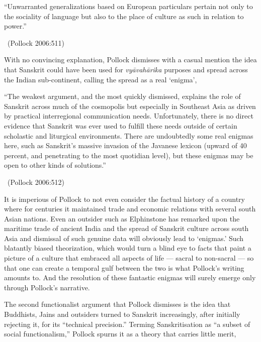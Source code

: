 \begin{myquote}
“Unwarranted generalizations based on European particulars pertain not only to the sociality of language but also to the place of culture as such in relation to power.” 

~\hfill (Pollock 2006:511)
\end{myquote}

With no convincing explanation, Pollock dismisses with a casual mention the idea that Sanskrit could have been used for \textit{vyāvahārika} purposes and spread across the Indian sub-continent, calling the spread as a real ‘enigma’,

\begin{myquote}
“The weakest argument, and the most quickly dismissed, explains the role of Sanskrit across much of the cosmopolis but especially in Southeast Asia as driven by practical interregional communication needs. Unfortunately, there is no direct evidence that Sanskrit was ever used to fulfill these needs outside of certain scholastic and liturgical environments. There are undoubtedly some real enigmas here, such as Sanskrit’s massive invasion of the Javanese lexicon (upward of 40 percent, and penetrating to the most quotidian level), but these enigmas may be open to other kinds of solutions.” 

~\hfill (Pollock 2006:512)
\end{myquote}

It is imperious of Pollock to not even consider the factual history of a country where for centuries it maintained trade and economic relations with several south Asian nations. Even an outsider such as Elphinstone has remarked upon the maritime trade of ancient India and the spread of Sanskrit culture across south Asia and dismissal of such genuine data will obviously lead to ‘enigmas.’ Such blatantly biased theorization, which would turn a blind eye to facts that paint a picture of a culture that embraced all aspects of life — sacral to non-sacral — so that one can create a temporal gulf between the two is what Pollock’s writing amounts to. And the resolution of these fantastic enigmas will surely emerge only through Pollock’s narrative.

The second functionalist argument that Pollock dismisses is the idea that Buddhists, Jains and outsiders turned to Sanskrit increasingly, after initially rejecting it, for its “technical precision.” Terming Sanskritisation as “a subset of social functionalism,” Pollock spurns it as a theory that carries little merit,

